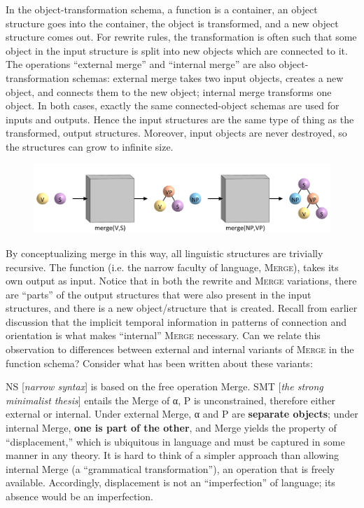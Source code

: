   In the object-transformation schema, a function is a container, an object structure goes into the container, the object is transformed, and a new object structure comes out. For rewrite rules, the transformation is often such that some object in the input structure is split into new objects which are connected to it. The operations “external merge” and “internal merge” are also object-transformation schemas: external merge takes two input objects, creates a new object, and connects them to the new object; internal merge transforms one object. In both cases, exactly the same connected-object schemas are used for inputs and outputs. Hence the input structures are the same type of thing as the transformed, output structures. Moreover, input objects are never destroyed, so the structures can grow to infinite size.

  
\begin{figure}
\includegraphics[width=\textwidth]{figures/Tilsen-img108.png}
\caption{\missingcaption}
\label{fig:5:4}
\end{figure}
 

  By conceptualizing merge in this way, all linguistic structures are trivially recursive. The function (i.e. the narrow faculty of language, \textsc{Merge}), takes its own output as input. Notice that in both the rewrite and \textsc{Merge} variations, there are “parts” of the output structures that were also present in the input structures, and there is a new object/structure that is created. Recall from earlier discussion that the implicit temporal information in patterns of connection and orientation is what makes “internal” \textsc{Merge} necessary. Can we relate this observation to differences between external and internal variants of \textsc{Merge} in the function schema? Consider what has been written about these variants:

NS [\textit{narrow syntax}] is based on the free operation Merge. SMT [\textit{the strong minimalist thesis}] entails the Merge of α, P is unconstrained, therefore either external or internal. Under external Merge, α and P are \textbf{separate objects}; under internal Merge, \textbf{one is part of the other}, and Merge yields the property of “displacement,” which is ubiquitous in language and must be captured in some manner in any theory. It is hard to think of a simpler approach than allowing internal Merge (a “grammatical transformation”), an operation that is freely available. Accordingly, displacement is not an “imperfection” of language; its absence would be an imperfection. \citep{Chomsky2001b}

